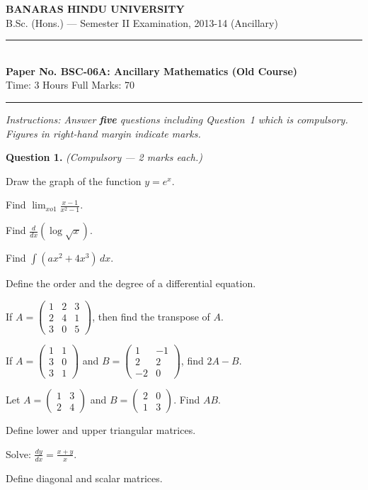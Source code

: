 \documentclass[11pt,a4paper]{article}
\begin{document}
\begin{center}
  {\large\bfseries BANARAS HINDU UNIVERSITY}\\[2pt]
  {\normalsize B.Sc. (Hons.) --- Semester II Examination, 2013-14 (Ancillary)}\\[6pt]
  \rule{0.8\linewidth}{0.5pt}\\[6pt]
  {\large\bfseries Paper No. BSC-06A: Ancillary Mathematics (Old Course)}\\[4pt]
  {\normalsize Time: 3 Hours \hfill Full Marks: 70}
\end{center}
\rule{\linewidth}{0.4pt}
\smallskip



\noindent   \textit{Instructions: Answer   \textbf{five} questions including Question~1 which is compulsory. Figures in right-hand margin indicate marks.}
\bigskip




\noindent   \textbf{Question 1.}   \textit{(Compulsory --- 2 marks each.)}

\begin{parts}
  \item Draw the graph of the function $y = e^x$.
  \item Find $\lim_{x  o 1} \frac{x-1}{x^2-1}$.
  \item Find $\frac{d}{dx}(\log \sqrt{x})$.
  \item Find $\int (ax^2 + 4x^3) \, dx$.
  \item Define the order and the degree of a differential equation.
  \item If $A = 
\begin{pmatrix} 1 & 2 & 3 \\ 2 & 4 & 1 \\ 3 & 0 & 5 \end{pmatrix}$, then find the transpose of $A$.
  \item If $A = 
\begin{pmatrix} 1 & 1 \\ 3 & 0 \\ 3 & 1 \end{pmatrix}$ and $B = 
\begin{pmatrix} 1 & -1 \\ 2 & 2 \\ -2 & 0 \end{pmatrix}$, find $2A - B$.
  \item Let $A = 
\begin{pmatrix} 1 & 3 \\ 2 & 4 \end{pmatrix}$ and $B = 
\begin{pmatrix} 2 & 0 \\ 1 & 3 \end{pmatrix}$. Find $AB$.
  \item Define lower and upper triangular matrices.
  \item Solve: $\frac{dy}{dx} = \frac{x+y}{x}$.
  \item Define diagonal and scalar matrices.
\end{parts}
\end{document}
